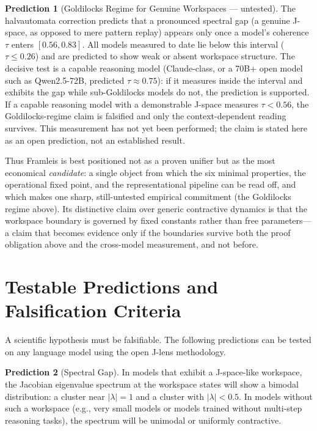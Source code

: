 \documentclass[11pt,a4paper]{article}
\theoremstyle{definition}
\newtheorem{prediction}{Prediction}
\begin{document}
\begin{prediction}[Goldilocks Regime for Genuine Workspaces --- untested]
The halvautomata correction predicts that a pronounced spectral gap (a genuine
J-space, as opposed to mere pattern replay) appears only once a model's coherence
$\tau$ enters $[0.56, 0.83]$. All models measured to date lie below this interval
($\tau \leq 0.26$) and are predicted to show weak or absent workspace structure. The
decisive test is a capable reasoning model (Claude-class, or a 70B+ open model such
as Qwen2.5-72B, predicted $\tau \approx 0.75$): if it measures inside the interval and
exhibits the gap while sub-Goldilocks models do not, the prediction is supported. If
a capable reasoning model with a demonstrable J-space measures $\tau < 0.56$, the
Goldilocks-regime claim is falsified and only the context-dependent reading survives.
This measurement has not yet been performed; the claim is stated here as an open
prediction, not an established result.
\end{prediction}

Thus Framleis is best positioned not as a proven unifier but as the most economical
\emph{candidate}: a single object from which the six minimal properties, the operational
fixed point, and the representational pipeline can be read off, and which makes one
sharp, still-untested empirical commitment (the Goldilocks regime above). Its
distinctive claim over generic contractive dynamics is that the workspace boundary
is governed by fixed constants rather than free parameters---a claim that becomes
evidence only if the boundaries survive both the proof obligation above and the
cross-model measurement, and not before.

\section{Testable Predictions and Falsification Criteria}
\label{sec:testable}

A scientific hypothesis must be falsifiable. The following predictions can be tested
on any language model using the open J-lens methodology.

\begin{prediction}[Spectral Gap]
In models that exhibit a J-space-like workspace, the Jacobian eigenvalue
spectrum at the workspace states will show a bimodal distribution: a cluster
near $|\lambda| = 1$ and a cluster with $|\lambda| < 0.5$. In models without
such a workspace (e.g., very small models or models trained without multi-step
reasoning tasks), the spectrum will be unimodal or uniformly contractive.
\end{prediction}
\end{document}
